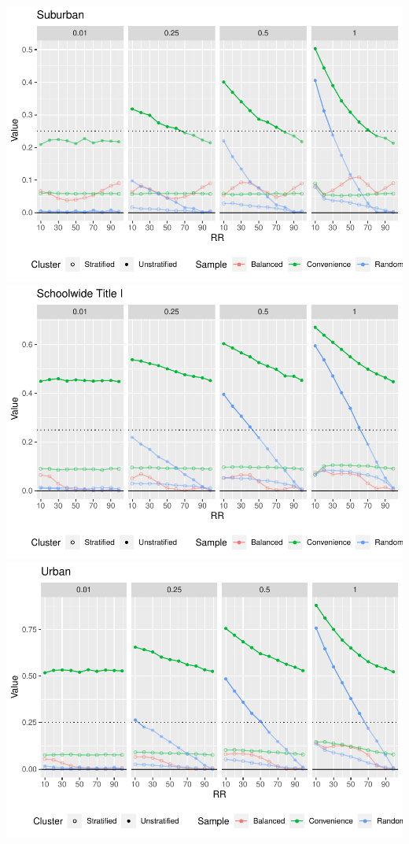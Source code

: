 \documentclass[
  english,
  man,floatsintext]{apa6}
\begin{document}
\includegraphics{5---Analysis_files/figure-latex/unnamed-chunk-18-1.pdf} \includegraphics{5---Analysis_files/figure-latex/unnamed-chunk-18-2.pdf} \includegraphics{5---Analysis_files/figure-latex/unnamed-chunk-18-3.pdf}
\end{document}
